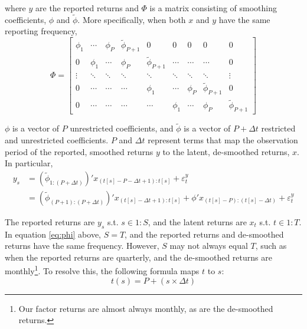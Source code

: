 \documentclass[11pt]{article}
\begin{document}
where $y$ are the reported returns and $\Phi$ is a matrix consisting of smoothing coefficients, $\phi$ and $\tilde{\phi}$. More specifically, when both $x$ and $y$ have the same reporting frequency,
\begin{equation}
\label{eq:phi}
	\Phi =
	\begin{bmatrix}
		\phi_{1} & \cdots & \phi_{P} & \tilde{\phi}_{P+1} & 0 & 0 & 0 & 0 & 0\\
		0 & \phi_{1} & \cdots & \phi_{P} & \tilde{\phi}_{P+1} & \cdots & \cdots & \cdots & 0\\
		\vdots & \ddots & \ddots & \ddots & \ddots & \ddots & \ddots & \ddots & \vdots\\
		0 & \cdots & \cdots & \cdots & \phi_{1} & \cdots & \phi_{P} & \tilde{\phi}_{P+1} & 0\\
		0 & \cdots & \cdots & \cdots & \cdots & \phi_{1} & \cdots & \phi_{P} & \tilde{\phi}_{P+1}
	\end{bmatrix} 
\end{equation}

$\phi$ is a vector of $P$ unrestricted coefficients, and $\tilde{\phi}$ is a vector of $P + \Delta t$ restricted and unrestricted coefficients. $P$ and $\Delta t$ represent terms that map the observation period of the reported, smoothed returns $y$ to the latent, de-smoothed returns, $x$. In particular,
\begin{align}
	y_{s} 	&= \left(\tilde{\phi}_{1:\left(P+\Delta t\right)}\right)'x_{(t[s]-P-\Delta t+1):t[s]}+\varepsilon_{t}^{y}	\\
			&= \left(\tilde{\phi}_{\left(P+1\right):\left(P+\Delta t\right)}\right)'x_{\left(t[s]-\Delta t+1\right):t[s]}+\phi'x_{(t[s]-P):\left(t[s]-\Delta t\right)}+\varepsilon_{t}^{y}
\end{align}

The reported returns are $y_s$ s.t. $s \in 1:S$, and the latent returns are $x_t$ s.t. $t \in 1:T$. In equation \eqref{eq:phi} above, $S = T$, and the reported returns and de-smoothed returns have the same frequency. However, $S$ may not always equal $T$, such as when the reported returns are quarterly, and the de-smoothed returns are monthly\footnote{Our factor returns are almost always monthly, as are the de-smoothed returns.}. To resolve this, the following formula maps $t$ to $s$:
\begin{equation}
	t(s) = P + (s \times \Delta t)
\end{equation}
\end{document}
